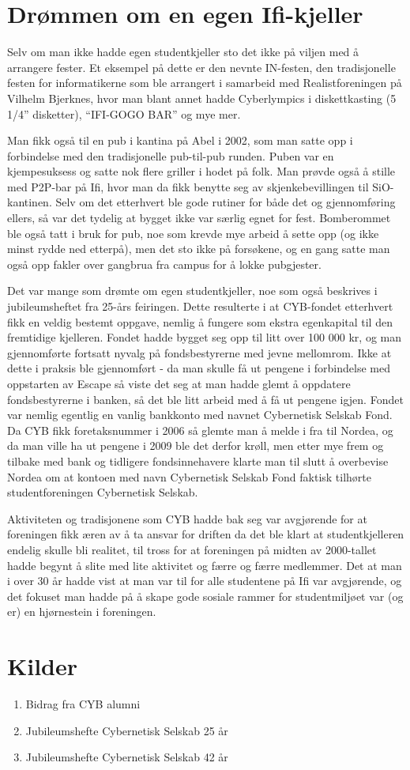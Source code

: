 \section{Drømmen om en egen Ifi-kjeller}

Selv om man ikke hadde egen studentkjeller sto det ikke på viljen med å arrangere fester. Et eksempel på dette er den nevnte IN-festen, den tradisjonelle festen for informatikerne som ble arrangert i samarbeid med Realistforeningen på Vilhelm Bjerknes, hvor man blant annet hadde Cyberlympics i diskettkasting (5 1/4'' disketter), ``IFI-GOGO BAR'' og mye mer. 

Man fikk også til en pub i kantina på Abel i 2002, som man satte opp i forbindelse med den tradisjonelle pub-til-pub runden. Puben var en kjempesuksess og satte nok flere griller i hodet på folk. Man prøvde også å stille med P2P-bar på Ifi, hvor man da fikk benytte seg av skjenkebevillingen til SiO-kantinen. Selv om det etterhvert ble gode rutiner for både det og gjennomføring ellers, så var det tydelig at bygget ikke var særlig egnet for fest. Bomberommet ble også tatt i bruk for pub, noe som krevde mye arbeid å sette opp (og ikke minst rydde ned etterpå), men det sto ikke på forsøkene, og en gang satte man også opp fakler over gangbrua fra campus for å lokke pubgjester.

Det var mange som drømte om egen studentkjeller, noe som også beskrives i jubileumsheftet fra 25-års feiringen. Dette resulterte i at CYB-fondet etterhvert fikk en veldig bestemt oppgave, nemlig å fungere som ekstra egenkapital til den fremtidige kjelleren. Fondet hadde bygget seg opp til litt over 100 000 kr, og man gjennomførte fortsatt nyvalg på fondsbestyrerne med jevne mellomrom. Ikke at dette i praksis ble gjennomført - da man skulle få ut pengene i forbindelse med oppstarten av Escape så viste det seg at man hadde glemt å oppdatere fondsbestyrerne i banken, så det ble litt arbeid med å få ut pengene igjen. Fondet var nemlig egentlig en vanlig bankkonto med navnet Cybernetisk Selskab Fond. Da CYB fikk foretaksnummer i 2006 så glemte man å melde i fra til Nordea, og da man ville ha ut pengene i 2009 ble det derfor krøll, men etter mye frem og tilbake med bank og tidligere fondsinnehavere klarte man til slutt å overbevise Nordea om at kontoen med navn Cybernetisk Selskab Fond faktisk tilhørte studentforeningen Cybernetisk Selskab.

Aktiviteten og tradisjonene som CYB hadde bak seg var avgjørende for at foreningen fikk æren av å ta ansvar for driften da det ble klart at studentkjelleren endelig skulle bli realitet, til tross for at foreningen på midten av 2000-tallet hadde begynt å slite med lite aktivitet og færre og færre medlemmer. Det at man i over 30 år hadde vist at man var til for alle studentene på Ifi var avgjørende, og det fokuset man hadde på å skape gode sosiale rammer for studentmiljøet var (og er) en hjørnestein i foreningen.

\section*{Kilder}

\begin{enumerate}
	\item Bidrag fra CYB alumni
	\item Jubileumshefte Cybernetisk Selskab 25 år
	\item Jubileumshefte Cybernetisk Selskab 42 år
\end{enumerate}